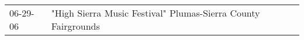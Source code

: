 \begin{supertabular}{p{0.25\columnwidth}p{0.75\columnwidth}}
 06-29-06 &  "High Sierra Music Festival" Plumas-Sierra County Fairgrounds \\
\end{supertabular}
